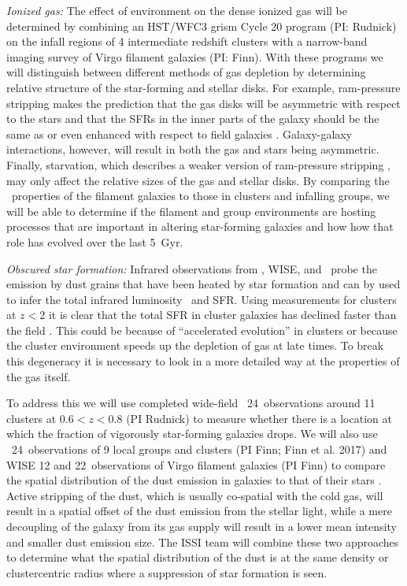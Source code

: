 \documentclass[11pt]{article}
\begin{document}
\textit{Ionized gas:} The effect of environment on the dense ionized
gas will be determined by combining an HST/WFC3 grism Cycle 20 program
(PI: Rudnick) on the infall regions of 4 intermediate redshift
clusters with a narrow-band imaging survey of Virgo filament galaxies (PI: Finn).  With these programs
we will distinguish between different methods of gas depletion by
determining relative structure of the star-forming and stellar disks.
For example, ram-pressure stripping makes the prediction that the gas
disks will be asymmetric \citep[e.g.][]{Quilis00,Crowl05} with respect
to the stars and that the SFRs in the inner parts of the galaxy should
be the same as or even enhanced with respect to field galaxies
\citep{Koopmann04,Weinmann10}.  Galaxy-galaxy interactions, however,
will result in both the gas and stars being asymmetric.  Finally,
starvation, which describes a weaker version of ram-pressure stripping
\citep[e.g.][]{Larson80}, may only affect the relative sizes of the
gas and stellar disks.  By comparing the \ha\ properties of the filament galaxies to those in clusters and infalling groups, we will be able to determine if the filament and group environments are hosting processes that are important in altering star-forming galaxies and how how that role has evolved over
the last 5~Gyr.

\textit{Obscured star formation:} Infrared observations from
\spitzer, WISE, and \herschel\ probe the emission by dust grains that have
been heated by star formation and can by used to infer the total
infrared luminosity \lir\ and SFR.  Using measurements for clusters at
$z<2$ it is clear that the total SFR in cluster galaxies has declined
faster than the field \citep{Finn10,Saintonge08,Tran10,Alberts14}.
This could be because of ``accelerated evolution'' in clusters
\citep{Papovich12} or because the cluster environment speeds up the
depletion of gas at late times.  To break this degeneracy it is
necessary to look in a more detailed way at the properties of the gas
itself.

To address this we will use completed wide-field
\spitzer\ 24\micron\ observations around 11 clusters at $0.6<z<0.8$
(PI Rudnick) to measure whether there is a location at which the
fraction of vigorously star-forming galaxies drops.  We will also use
\spitzer\ 24\micron\ observations of 9 local groups and clusters (PI Finn; Finn et al. 2017) and WISE 12 and 22\micron\ observations of Virgo filament galaxies (PI Finn) to
compare the spatial distribution of the dust emission in galaxies to
that of their stars .  Active stripping of the dust, which is usually co-spatial with the cold gas, will
result in a spatial offset of the dust emission from the stellar
light, while a mere decoupling of the galaxy from its gas supply will
result in a lower mean intensity and smaller dust emission size.  The
ISSI team will combine these two approaches to determine what the
spatial distribution of the dust is at the same density or
clustercentric radius where a suppression of star formation is seen.
\end{document}
